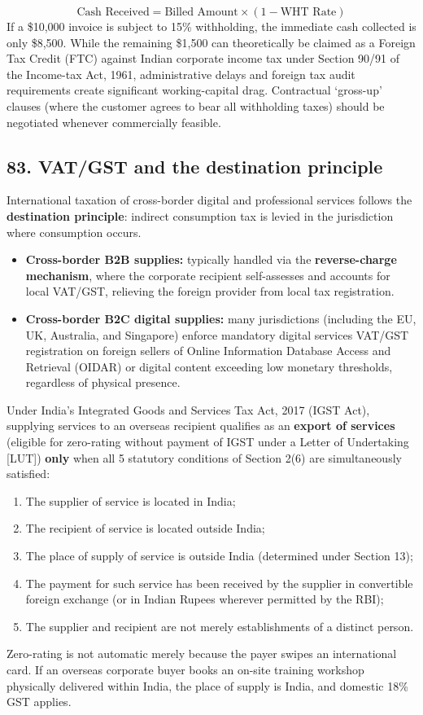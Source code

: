 \begin{equation}
\text{Cash Received} = \text{Billed Amount} \times (1 - \text{WHT Rate})
\end{equation}
If a \$10,000 invoice is subject to 15\% withholding, the immediate cash collected is only \$8,500. While the remaining \$1,500 can theoretically be claimed as a Foreign Tax Credit (FTC) against Indian corporate income tax under Section 90/91 of the Income-tax Act, 1961, administrative delays and foreign tax audit requirements create significant working-capital drag. Contractual `gross-up' clauses (where the customer agrees to bear all withholding taxes) should be negotiated whenever commercially feasible.

\subsection{83. VAT/GST and the destination principle}

International taxation of cross-border digital and professional services follows the \textbf{destination principle}: indirect consumption tax is levied in the jurisdiction where consumption occurs.
\begin{itemize}
    \item \textbf{Cross-border B2B supplies:} typically handled via the \textbf{reverse-charge mechanism}, where the corporate recipient self-assesses and accounts for local VAT/GST, relieving the foreign provider from local tax registration.
    \item \textbf{Cross-border B2C digital supplies:} many jurisdictions (including the EU, UK, Australia, and Singapore) enforce mandatory digital services VAT/GST registration on foreign sellers of Online Information Database Access and Retrieval (OIDAR) or digital content exceeding low monetary thresholds, regardless of physical presence.
\end{itemize}

Under India's Integrated Goods and Services Tax Act, 2017 (IGST Act), supplying services to an overseas recipient qualifies as an \textbf{export of services} (eligible for zero-rating without payment of IGST under a Letter of Undertaking [LUT]) \textbf{only} when all 5 statutory conditions of Section 2(6) are simultaneously satisfied:
\begin{enumerate}
    \item The supplier of service is located in India;
    \item The recipient of service is located outside India;
    \item The place of supply of service is outside India (determined under Section 13);
    \item The payment for such service has been received by the supplier in convertible foreign exchange (or in Indian Rupees wherever permitted by the RBI);
    \item The supplier and recipient are not merely establishments of a distinct person.
\end{enumerate}
Zero-rating is not automatic merely because the payer swipes an international card. If an overseas corporate buyer books an on-site training workshop physically delivered within India, the place of supply is India, and domestic 18\% GST applies.

